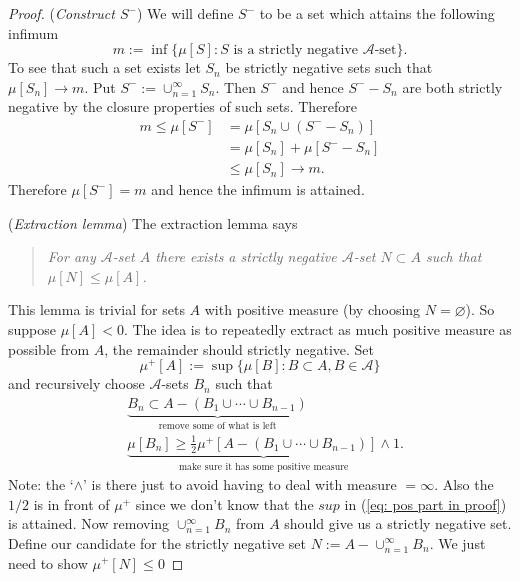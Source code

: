 \begin{shaded}
\begin{proof}
({\it Construct $S^-$}) We will define $S^-$ to be a set which attains the following infimum
\[m:=\inf\{\mu[S]\colon \text{$S$ is a strictly negative $\mathcal A$-set} \}.  \]
 To see that such a set exists let $S_n$ be strictly negative sets such that $\mu[S_n]\rightarrow m$. Put $S^-:=\cup_{n=1}^\infty S_n$. Then $S^-$ and hence $S^- - S_n$ are both strictly negative by the closure properties of such sets. Therefore
\begin{align*}
m \leq \mu[S^-]
&= \mu[S_n\cup (S^- - S_n)]\\
&= \mu[S_n] + \mu[S^- - S_n] \\
&\leq \mu[S_n]\rightarrow m.
\end{align*}
Therefore $\mu[S^-]=m$ and hence the infimum is attained.


({\it Extraction lemma}) The extraction lemma says
\begin{quote}
{\it
For any $\mathcal A$-set $A$ there exists a strictly negative $\mathcal A$-set $N\subset A$ such that $\mu[N]\leq \mu[A]$.}
\end{quote}
This lemma is trivial for sets $A$ with positive measure (by choosing $N=\varnothing$). So suppose $\mu[A]< 0$. The idea is to repeatedly extract as much positive measure as possible from $A$, the remainder should strictly negative.
Set
\begin{equation}
\label{eq: pos part in proof}
\mu^+[A]:=\sup\{\mu[B]\colon B\subset A, B\in\mathcal A \}
\end{equation}
and recursively choose $\mathcal A$-sets $B_n$ such that
\begin{align}
&\underbrace{B_n \subset A - (B_1\cup \cdots \cup B_{n-1})}_\text{remove some of what is left} \\
&\underbrace{\mu[B_n] \geq \textstyle\frac{1}{2}\mu^+ [A - (B_1\cup \cdots \cup B_{n-1})]\wedge 1}_\text{make sure it has some positive measure}. \label{eq: wedge}
\end{align}
Note: the `$\wedge$' is there just to avoid having to deal with measure $=\infty$. Also the $1/2$ is in front of $\mu^+$ since we don't know that the $sup$ in (\ref{eq: pos part in proof}) is attained.
Now removing $\cup_{n=1}^\infty B_n$  from $A$ should give us a strictly negative set.
Define our candidate for the strictly negative set $N :=A - \cup_{n=1}^\infty B_n$. We just need to show $\mu^+[N]\leq 0$



\end{proof}
\end{shaded}
